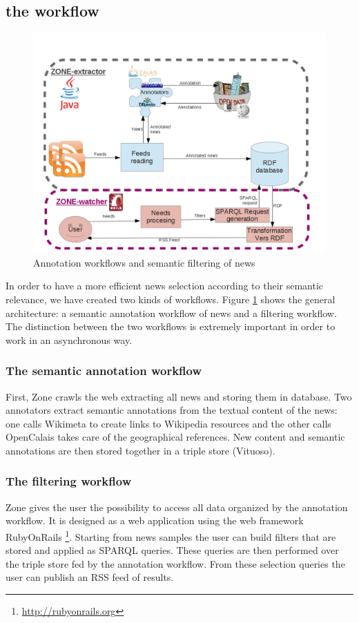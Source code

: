\documentclass{llncs}
\begin{document}
\subsection{the workflow}
%
\begin{figure}[htb!]
	\begin{centering}
	\includegraphics[width=1\textwidth]{diagramArchi.png}
	\caption{Annotation workflows and semantic filtering of news}
	\label{fig:WF}
	\end{centering}
\end{figure}

In order to have a more efficient news selection according to their semantic relevance, we have created two kinds of workflows. Figure \ref{fig:WF} shows the general architecture: a semantic annotation workflow of news and a filtering workflow. The distinction between the two workflows is extremely important in order to work in an asynchronous way.


\subsubsection{The semantic annotation workflow}
First, Zone crawls the web extracting all news and storing them in database.
Two annotators extract semantic annotations from the textual content of the news: one calls Wikimeta to create links to Wikipedia resources and the other calls OpenCalais takes care of the geographical references.
New content and semantic annotations are then stored together in a triple store (Vituoso).

\subsubsection{The filtering workflow}
Zone gives the user the possibility to access all data organized by the annotation workflow. It is designed as a web application using the web framework RubyOnRails \footnote{\url{http://rubyonrails.org}}. Starting from news samples the user can build filters that are stored and applied as SPARQL queries. These queries are then performed over the triple store fed by the annotation workflow. From these selection queries the user can publish an RSS feed of results.
\end{document}
